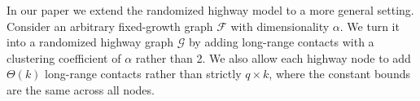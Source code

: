 



In our paper we extend the randomized highway model to a more general setting.
Consider an arbitrary fixed-growth graph $\mathcal F$ with dimensionality
$\alpha$.
We turn it into a randomized highway graph $\mathcal{G}$ by adding long-range
contacts with a clustering coefficient of $\alpha$ rather than 2.
We also allow each highway node to add $\Theta(k)$ long-range contacts rather
than strictly $q \times k$, where the constant bounds are the same across all
nodes.

